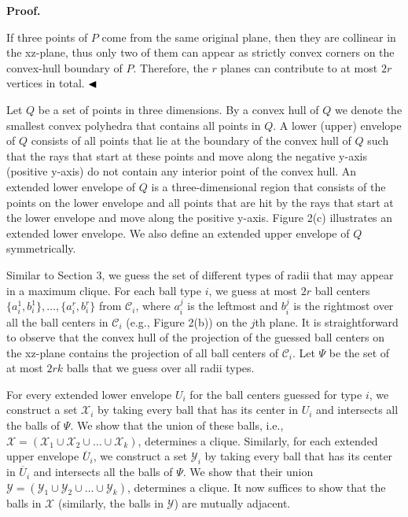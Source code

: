 \documentclass[10pt,a4paper]{amsart}
\begin{document}
\par
\par
\par
\par\medskip\noindent\textbf{Proof.}\par
If three points of $P$ come from the same original plane, then they are collinear in the xz-plane, thus only two of them can appear as strictly convex corners on the convex-hull boundary of $P$. Therefore, the $r$ planes can contribute to at most $2r$ vertices in total. $\hfill\blacktriangleleft$
\par
\par
Let $Q$ be a set of points in three dimensions. By a convex hull of $Q$ we denote the smallest convex polyhedra that contains all points in $Q$. A lower (upper) envelope of $Q$ consists of all points that lie at the boundary of the convex hull of $Q$ such that the rays that start at these points and move along the negative y-axis (positive y-axis) do not contain any interior point of the convex hull. An extended lower envelope of $Q$ is a three-dimensional region that consists of the points on the lower envelope and all points that are hit by the rays that start at the lower envelope and move along the positive y-axis. Figure 2(c) illustrates an extended lower envelope. We also define an extended upper envelope of $Q$ symmetrically.
\par
\par
Similar to Section 3, we guess the set of different types of radii that may appear in a maximum clique. For each ball type $i$, we guess at most $2r$ ball centers $\{a^{1}_{i},b^{1}_{i}\},\ldots,\{a^{r}_{i},b^{r}_{i}\}$ from $\mathcal{C}_{i}$, where $a^{j}_{i}$ is the leftmost and $b^{j}_{i}$ is the rightmost over all the ball centers in $\mathcal{C}_{i}$ (e.g., Figure 2(b)) on the $j$th plane. It is straightforward to observe that the convex hull of the projection of the guessed ball centers on the xz-plane contains the projection of all ball centers of $\mathcal{C}_{i}$. Let $\Psi$ be the set of at most $2rk$ balls that we guess over all radii types.
\par
\par
For every extended lower envelope $U_{i}$ for the ball centers guessed for type $i$, we construct a set $\mathcal{X}_{i}$ by taking every ball that has its center in $U_{i}$ and intersects all the balls of $\Psi$. We show that the union of these balls, i.e., $\mathcal{X}=(\mathcal{X}_{1}\cup\mathcal{X}_{2}\cup\ldots\cup\mathcal{X}_{k})$, determines a clique. Similarly, for each extended upper envelope $\overline{U}_{i}$, we construct a set $\mathcal{Y}_{i}$ by taking every ball that has its center in $\overline{U}_{i}$ and intersects all the balls of $\Psi$. We show that their union $\mathcal{Y}=(\mathcal{Y}_{1}\cup\mathcal{Y}_{2}\cup\ldots\cup\mathcal{Y}_{k})$, determines a clique. It now suffices to show that the balls in $\mathcal{X}$ (similarly, the balls in $\mathcal{Y}$) are mutually adjacent.
\end{document}
